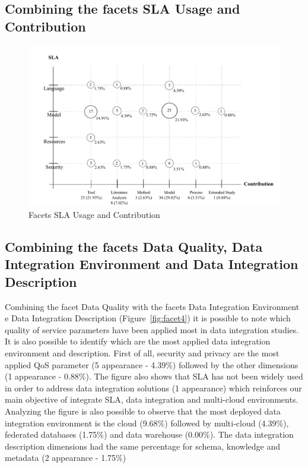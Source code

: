 \subsection{Combining the facets SLA Usage and Contribution}

\begin{figure}[h!]
\centering
\includegraphics[scale=0.5]{figs/bubble-charts/SLA-Contribution.pdf}
\caption{Facets SLA Usage and Contribution}\label{fig:facet3}
\end{figure}


\subsection{Combining the facets Data Quality, Data Integration Environment and Data Integration Description}

Combining the facet Data Quality with the facets Data Integration Environment e Data Integration Description
(Figure~\ref{fig:facet4}) it is possible to note which quality of service parameters have been applied most in
data integration studies.
It is also possible to identify which are the most applied data integration environment and description.
First of all, security and privacy are the most applied QoS parameter (5 appearance - 4.39\%)
followed by the other dimensions (1 appearance - 0.88\%). 
The figure also shows that SLA has not been widely used in order to address data integration solutions
(1 appearance) which reinforces our main objective of integrate SLA, data integration and multi-cloud 
environments. 
Analyzing the figure is also possible to observe that the most deployed data integration environment is 
the cloud (9.68\%) followed by multi-cloud (4.39\%), federated databases (1.75\%) and data warehouse (0.00\%).
The data integration description dimensions had the same percentage for schema, knowledge and metadata (2 appearance - 1.75\%)


